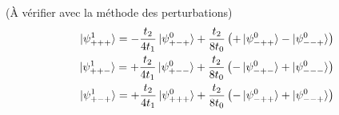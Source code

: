 \documentclass[11pt]{article}
\begin{document}
(À vérifier avec la méthode des perturbations)
\begin{align}
	\ket{\psi^1_{+++}} = -\frac{t_2}{4 t_1} \ket{\psi^0_{+-+}} + \frac{t_2}{8 t_0}\left( +\ket{\psi^0_{-++}} - \ket{\psi^0_{--+}} \right) \\
	\ket{\psi^1_{++-}} = +\frac{t_2}{4 t_1} \ket{\psi^0_{+--}} + \frac{t_2}{8 t_0} \left( -\ket{\psi^0_{-+-}} + \ket{\psi^0_{---}} \right) \\
	\ket{\psi^1_{+-+}} = +\frac{t_2}{4 t_1} \ket{\psi^0_{+++}} +  \frac{t_2}{8 t_0} \left( -\ket{\psi^0_{-++}} + \ket{\psi^0_{--+}} \right) \\
\end{align}
\end{document}
